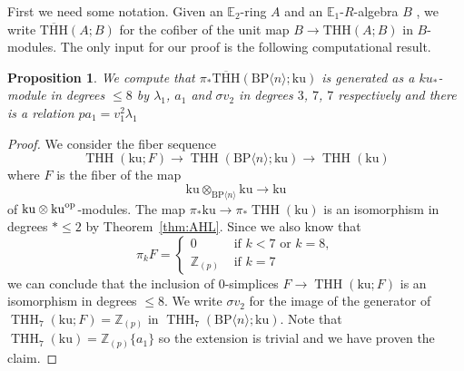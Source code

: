 \documentclass[11pt]{amsart}
\newcommand{\mr}[1]{\mathrm{#1}}
\newcommand{\BP}{\mr{BP}}
\newcommand{\ku}{\mathrm{ku}}
\DeclareMathOperator{\THH}{THH}
\newtheorem{proposition}[equation]{Proposition}
\theoremstyle{definition}
\numberwithin{equation}{section}
\numberwithin{figure}{section}
\begin{document}
First we need some notation. Given an $\mathbb{E}_2$-ring $A$ and an $\mathbb{E}_1$-$R$-algebra $B$ , we write 
 $\overline{\mathrm{THH}}(A;B)$ for the cofiber of the unit map 
$B\to \mathrm{THH}(A;B)$ in $B$-modules. The only input for our proof is the following computational result. 

\begin{proposition}\label{prop-computational-input}
We compute that $\pi_*\overline{\mathrm{THH}}(\BP\langle n\rangle;\ku)$  is generated as a $ku_*$-module in degrees $\le 8$ by $\lambda_1$, $a_1$ and $\sigma v_2$ in degrees $3$, $7$, $7$ respectively and there is a relation $pa_1= v_1^2 \lambda_1$
\end{proposition}

\begin{proof}
We consider the fiber sequence  
\[ \THH(\ku;F) \to  \THH(\BP\langle n\rangle ; \ku )\to 
\THH(\ku) 
\]
where $F$ is the fiber of the map 
\[ \ku \otimes_{\BP\langle n \rangle }\ku \to \ku \]
of $\ku\otimes \ku^{\textup{op}}$-modules. 
The map $\pi_*\ku\to \pi_*\THH(\ku)$ is an isomorphism in degrees $*\le 2$ by Theorem~\ref{thm:AHL}. Since we also know that  
\[ 
\pi_k F = \begin{cases} 0 & \text{ if } k<7\text{ or } k = 8,\\
           \mathbb{Z}_{(p)} &\text{ if } k=7  
\end{cases}
\]
we can conclude that the inclusion of $0$-simplices $F\to \THH(\ku;F)$ is an isomorphism in degrees $\le 8$. We write $\sigma v_2$ for the image of the generator of $\THH_{7}(\ku;F)=\mathbb{Z}_{(p)}$ in $\THH_7(\BP\langle n\rangle ;\ku)$. Note that $\THH_7(\ku)=\mathbb{Z}_{(p)}\{a_1\}$ so the extension is trivial and we have proven the claim. 
\end{proof}
\end{document}
